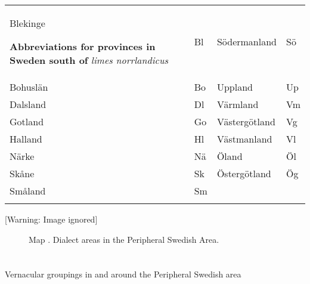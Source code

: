 \begin{tabular}{llll}
\lsptoprule
Blekinge

\begin{minipage}{5.8752in}
\textbf{Abbreviations for provinces in Sweden south of}\textit{ limes norrlandicus}

\end{minipage} & Bl & Södermanland & Sö\\
Bohuslän & Bo & Uppland & Up\\
Dalsland & Dl & Värmland & Vm\\
Gotland & Go & Västergötland & Vg\\
Halland & Hl & Västmanland & Vl\\
Närke & Nä & Öland & Öl\\
Skåne & Sk & Östergötland & Ög\\
Småland & Sm &  & \\
\lspbottomrule
\end{tabular}

  [Warning: Image ignored] %
 

\begin{stylecaption}

\end{stylecaption}

\clearpage 

\begin{figure}[h]

\begin{minipage}{6.6547in}

\begin{stylecaption}
Map . Dialect areas in the Peripheral Swedish Area.

\end{stylecaption}

\end{minipage}

\end{figure}

\section{}

Vernacular groupings in and around the Peripheral Swedish area

